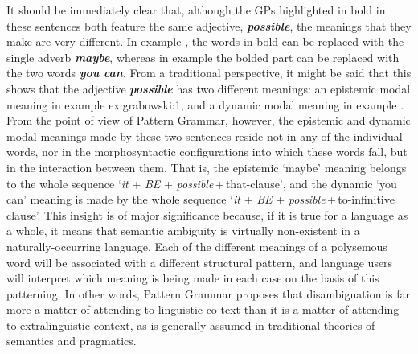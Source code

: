 \documentclass[output=paper]{langscibook}
\begin{document}
\largerpage[-1]%
It should be immediately clear that, although the GPs highlighted in bold in these sentences both feature the same adjective, \textbf{\textit{possible}}, the meanings that they make are very different. In example , the words in bold can be replaced with the single adverb \textbf{\textit{maybe}}, whereas in example  the bolded part can be replaced with the two words \textbf{\textit{you} \textit{can}}. From a traditional perspective, it might be said that this shows that the adjective \textbf{\textit{possible}} has two different meanings: an epistemic modal meaning in example {ex:grabowski:1}, and a dynamic modal meaning in example . From the point of view of Pattern Grammar, however, the epistemic and dynamic modal meanings made by these two sentences reside not in any of the individual words, nor in the morphosyntactic configurations into which these words fall, but in the interaction between them. That is, the epistemic ‘maybe’ meaning belongs to the whole sequence ‘\textit{it} + \textit{BE} + \textit{possible}\,+\,that-clause’, and the dynamic ‘you can’ meaning is made by the whole sequence ‘\textit{it} + \textit{BE} + \textit{possible}\,+\,to-infinitive clause’. This insight is of major significance because, if it is true for a language as a whole, it means that semantic ambiguity is virtually non-existent in a naturally-occurring language. Each of the different meanings of a polysemous word will be associated with a different structural pattern, and language users will interpret which meaning is being made in each case on the basis of this patterning. In other words, Pattern Grammar proposes that disambiguation is far more a matter of attending to linguistic co-text than it is a matter of attending to extralinguistic context, as is generally assumed in traditional theories of semantics and pragmatics.
\end{document}
